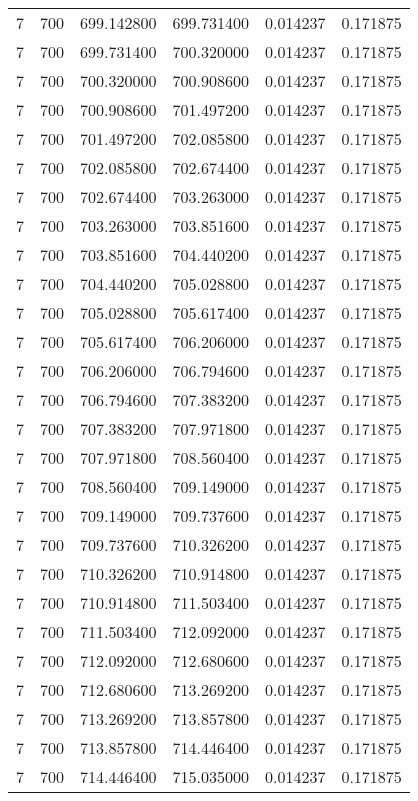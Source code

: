 \begin{longtable}{rrrrrr}
7 & 700 & 699.142800 & 699.731400 & 0.014237 & 0.171875 \\
7 & 700 & 699.731400 & 700.320000 & 0.014237 & 0.171875 \\
7 & 700 & 700.320000 & 700.908600 & 0.014237 & 0.171875 \\
7 & 700 & 700.908600 & 701.497200 & 0.014237 & 0.171875 \\
7 & 700 & 701.497200 & 702.085800 & 0.014237 & 0.171875 \\
7 & 700 & 702.085800 & 702.674400 & 0.014237 & 0.171875 \\
7 & 700 & 702.674400 & 703.263000 & 0.014237 & 0.171875 \\
7 & 700 & 703.263000 & 703.851600 & 0.014237 & 0.171875 \\
7 & 700 & 703.851600 & 704.440200 & 0.014237 & 0.171875 \\
7 & 700 & 704.440200 & 705.028800 & 0.014237 & 0.171875 \\
7 & 700 & 705.028800 & 705.617400 & 0.014237 & 0.171875 \\
7 & 700 & 705.617400 & 706.206000 & 0.014237 & 0.171875 \\
7 & 700 & 706.206000 & 706.794600 & 0.014237 & 0.171875 \\
7 & 700 & 706.794600 & 707.383200 & 0.014237 & 0.171875 \\
7 & 700 & 707.383200 & 707.971800 & 0.014237 & 0.171875 \\
7 & 700 & 707.971800 & 708.560400 & 0.014237 & 0.171875 \\
7 & 700 & 708.560400 & 709.149000 & 0.014237 & 0.171875 \\
7 & 700 & 709.149000 & 709.737600 & 0.014237 & 0.171875 \\
7 & 700 & 709.737600 & 710.326200 & 0.014237 & 0.171875 \\
7 & 700 & 710.326200 & 710.914800 & 0.014237 & 0.171875 \\
7 & 700 & 710.914800 & 711.503400 & 0.014237 & 0.171875 \\
7 & 700 & 711.503400 & 712.092000 & 0.014237 & 0.171875 \\
7 & 700 & 712.092000 & 712.680600 & 0.014237 & 0.171875 \\
7 & 700 & 712.680600 & 713.269200 & 0.014237 & 0.171875 \\
7 & 700 & 713.269200 & 713.857800 & 0.014237 & 0.171875 \\
7 & 700 & 713.857800 & 714.446400 & 0.014237 & 0.171875 \\
7 & 700 & 714.446400 & 715.035000 & 0.014237 & 0.171875 \\

\end{longtable}
